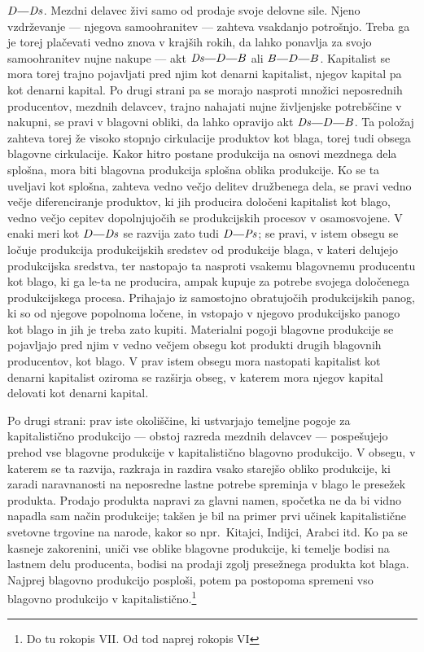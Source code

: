 \documentclass[kapital_02.tex]{subfiles}
\begin{document}
\(\KPED\KPEcrta\KPEDs\). Mezdni delavec živi samo od prodaje svoje delovne sile. Njeno vzdrževanje --- njegova samoohranitev --- zahteva vsakdanjo potrošnjo. Treba ga je torej plačevati vedno znova v krajših rokih, da lahko ponavlja za svojo samoohranitev nujne nakupe --- akt \(\KPEDs\KPEcrta\KPED\KPEcrta\KPEB\) ali \(\KPEB\KPEcrta\KPED\KPEcrta\KPEB\). Kapitalist se mora torej trajno pojavljati pred njim kot denarni kapitalist, njegov kapital pa kot denarni kapital. Po drugi strani pa se morajo nasproti množici neposrednih producentov, mezdnih delavcev, trajno nahajati nujne življenjske potrebščine v nakupni, se pravi v blagovni obliki, da lahko opravijo akt \(\KPEDs\KPEcrta\KPED\KPEcrta\KPEB\). Ta položaj zahteva torej že visoko stopnjo cirkulacije produktov kot blaga, torej tudi obsega blagovne cirkulacije. Kakor hitro postane produkcija na osnovi mezdnega dela splošna, mora biti blagovna produkcija splošna oblika produkcije. Ko se ta uveljavi kot splošna, zahteva vedno večjo delitev družbenega dela, se pravi vedno večje diferenciranje produktov, ki jih producira določeni kapitalist kot blago, vedno večjo cepitev dopolnjujočih se produkcijskih procesov v osamosvojene. V enaki meri kot \(\KPED\KPEcrta\KPEDs\) se razvija zato tudi \(\KPED\KPEcrta\KPEPs\); se pravi, v istem obsegu se ločuje produkcija produkcijskih sredstev od produkcije blaga, v kateri delujejo produkcijska sredstva, ter nastopajo ta nasproti vsakemu blagovnemu producentu kot blago, ki ga le-ta ne producira, ampak kupuje za potrebe svojega določenega produkcijskega procesa. Prihajajo iz samostojno obratujočih produkcijskih panog, ki so od njegove popolnoma ločene, in vstopajo v njegovo produkcijsko panogo kot blago in jih je treba zato kupiti. Materialni pogoji blagovne produkcije se pojavljajo pred njim v vedno večjem obsegu kot produkti drugih blagovnih producentov, kot blago. V prav istem obsegu mora nastopati kapitalist kot denarni kapitalist oziroma se razširja obseg, v katerem mora njegov kapital delovati kot denarni kapital.

Po drugi strani: prav iste okoliščine, ki ustvarjajo temeljne pogoje za kapitalistično produkcijo --- obstoj razreda mezdnih delavcev --- pospešujejo prehod vse blagovne produkcije v kapitalistično blagovno produkcijo. V obsegu, v katerem se ta razvija, razkraja in razdira vsako starejšo obliko produkcije, ki zaradi naravnanosti na neposredne lastne potrebe spreminja v blago le presežek produkta. Prodajo produkta napravi za glavni namen, spočetka ne da bi vidno napadla sam način produkcije; takšen je bil na primer prvi učinek kapitalistične svetovne trgovine na narode, kakor so npr.\ Kitajci, Indijci, Arabci itd. Ko pa se kasneje zakorenini, uniči vse oblike blagovne produkcije, ki temelje bodisi na lastnem delu producenta, bodisi na prodaji zgolj presežnega produkta kot blaga. Najprej blagovno produkcijo posploši, potem pa postopoma spremeni vso blagovno produkcijo v kapitalistično.\footnote{Do tu rokopis VII. Od tod naprej rokopis VI}
\end{document}
